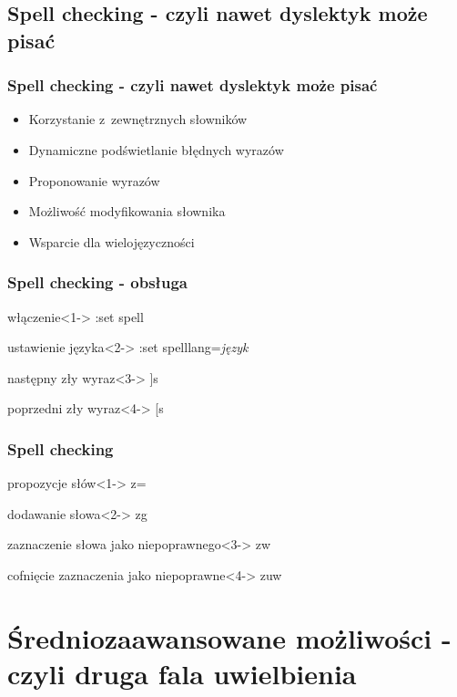 \documentclass{beamer}
\begin{document}
\subsection{Spell checking - czyli nawet dyslektyk może pisać}
\begin{frame}
	\frametitle{Spell checking - czyli nawet dyslektyk może pisać}
	\begin{itemize}[<+->]
		\item Korzystanie z~zewnętrznych słowników
		\item Dynamiczne podświetlanie błędnych wyrazów
		\item Proponowanie wyrazów
		\item Możliwość modyfikowania słownika
		\item Wsparcie dla wielojęzyczności
	\end{itemize}
\end{frame}
\begin{frame}
	\frametitle{Spell checking - obsługa}
	\begin{block}{włączenie}<1->
		:set spell
	\end{block}
	\begin{block}{ustawienie języka}<2->
		:set spelllang=\textit{język}	
	\end{block}
	\begin{block}{następny zły wyraz}<3->
		]s
	\end{block}
	\begin{block}{poprzedni zły wyraz}<4->
		[s
	\end{block}
\end{frame}
\begin{frame}
	\frametitle{Spell checking}
	\begin{block}{propozycje słów}<1->
		z=
	\end{block}
	\begin{block}{dodawanie słowa}<2->
		zg
	\end{block}
	\begin{block}{zaznaczenie słowa jako niepoprawnego}<3->
		zw
	\end{block}
	\begin{block}{cofnięcie zaznaczenia jako niepoprawne}<4->
		zuw
	\end{block}
\end{frame}
\section{Średniozaawansowane możliwości - czyli druga fala uwielbienia}
\end{document}
